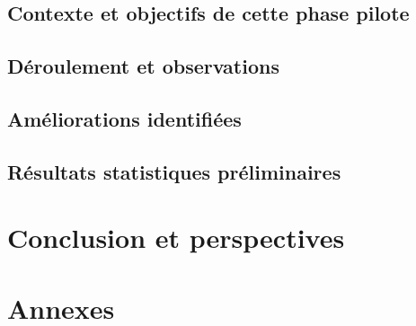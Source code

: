 \documentclass[11pt]{article}
\begin{document}
\subsection{Contexte et objectifs de cette phase pilote}
\subsection{Déroulement et observations}
\subsection{Améliorations identifiées}
\subsection{Résultats statistiques préliminaires}

\newpage


\newpage

\section{Conclusion et perspectives}

\newpage



\newpage

\appendix
\section{Annexes}
\end{document}
